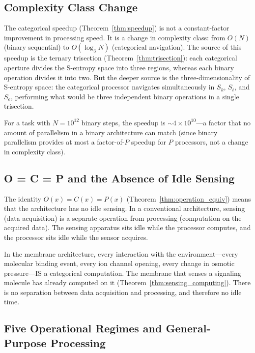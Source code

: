\documentclass[twocolumn,10pt]{article}
\theoremstyle{remark}
\newcommand{\Sk}{S_k}
\newcommand{\St}{S_t}
\newcommand{\Se}{S_e}
\begin{document}
\subsection{Complexity Class Change}

The categorical speedup (Theorem~\ref{thm:speedup}) is not a constant-factor improvement in processing speed. It is a change in complexity class: from $O(N)$ (binary sequential) to $O(\log_3 N)$ (categorical navigation). The source of this speedup is the ternary trisection (Theorem~\ref{thm:trisection}): each categorical aperture divides the S-entropy space into three regions, whereas each binary operation divides it into two. But the deeper source is the three-dimensionality of S-entropy space: the categorical processor navigates simultaneously in $\Sk$, $\St$, and $\Se$, performing what would be three independent binary operations in a single trisection.

For a task with $N = 10^{12}$ binary steps, the speedup is $\sim 4 \times 10^{10}$---a factor that no amount of parallelism in a binary architecture can match (since binary parallelism provides at most a factor-of-$P$ speedup for $P$ processors, not a change in complexity class).

\subsection{O = C = P and the Absence of Idle Sensing}

The identity $O(x) = C(x) = P(x)$ (Theorem~\ref{thm:operation_equiv}) means that the architecture has no idle sensing. In a conventional architecture, sensing (data acquisition) is a separate operation from processing (computation on the acquired data). The sensing apparatus sits idle while the processor computes, and the processor sits idle while the sensor acquires.

In the membrane architecture, every interaction with the environment---every molecular binding event, every ion channel opening, every change in osmotic pressure---IS a categorical computation. The membrane that senses a signaling molecule has already computed on it (Theorem~\ref{thm:sensing_computing}). There is no separation between data acquisition and processing, and therefore no idle time.

\subsection{Five Operational Regimes and General-Purpose Processing}
\end{document}
